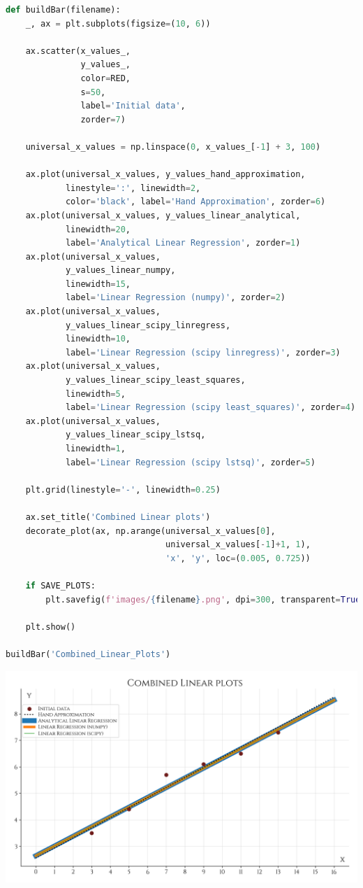 \documentclass[a4paper, 14pt]{extarticle}
\begin{document}
\begin{center}
    \begin{lstlisting}[language=Python]
def buildBar(filename):
    _, ax = plt.subplots(figsize=(10, 6))

    ax.scatter(x_values_, 
               y_values_, 
               color=RED,
               s=50,
               label='Initial data',
               zorder=7)

    universal_x_values = np.linspace(0, x_values_[-1] + 3, 100)

    ax.plot(universal_x_values, y_values_hand_approximation, 
            linestyle=':', linewidth=2, 
            color='black', label='Hand Approximation', zorder=6)
    ax.plot(universal_x_values, y_values_linear_analytical, 
            linewidth=20, 
            label='Analytical Linear Regression', zorder=1)
    ax.plot(universal_x_values, 
            y_values_linear_numpy, 
            linewidth=15, 
            label='Linear Regression (numpy)', zorder=2)
    ax.plot(universal_x_values, 
            y_values_linear_scipy_linregress, 
            linewidth=10, 
            label='Linear Regression (scipy linregress)', zorder=3)
    ax.plot(universal_x_values, 
            y_values_linear_scipy_least_squares, 
            linewidth=5, 
            label='Linear Regression (scipy least_squares)', zorder=4)
    ax.plot(universal_x_values, 
            y_values_linear_scipy_lstsq, 
            linewidth=1, 
            label='Linear Regression (scipy lstsq)', zorder=5)

    plt.grid(linestyle='-', linewidth=0.25)

    ax.set_title('Combined Linear plots')
    decorate_plot(ax, np.arange(universal_x_values[0], 
                                universal_x_values[-1]+1, 1), 
                                'x', 'y', loc=(0.005, 0.725))
    
    if SAVE_PLOTS:
        plt.savefig(f'images/{filename}.png', dpi=300, transparent=True)

    plt.show()

buildBar('Combined_Linear_Plots')
    \end{lstlisting}
\end{center}

\begin{center}
    \includegraphics[width=1\textwidth, height=1\textheight, keepaspectratio]{Combined_Linear_Plots} \\
\end{center}
\end{document}
